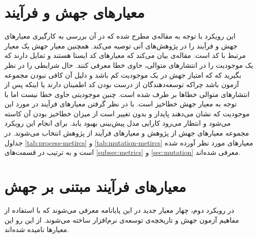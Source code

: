\section{معیارهای جهش و فرآیند}
\label{sec:method-phase1}

این رویکرد با توجه به مقاله‌ی \cite{bowes2016mutation} مطرح شده که در آن بررسی به کارگیری معیارهای جهش و فرآیند را در پژوهش‌های آتی توصیه می‌کند.  همچنین  معیار جهش یک معیار  مرتبط با کد است. مقاله‌ی \cite{rahman2013and}  بیان می‌کند که معیارهای کد ایستا هستند و تمایل دارند که یک موجودیت را در انتشارهای متوالی، حاوی خطا معرفی کنند. حال شرایطی را در نظر بگیرید که که امتیاز جهش در یک موجودیت کم باشد و دلیل آن کافی نبودن مجموعه آزمون باشد چراکه توسعه‌دهندگان از درست بودن کد اطمینان دارند یا اینکه پس از انتشارهای متوالی خطاها بر طرف شده است. چنین موجودیتی حاوی خطا نیست اما با توجه به معیار جهش خطا‌خیز است. با در نظر گرفتن معیارهای فرآیند در مورد این موجودیت که نشان می‌دهند پایدار و بدون تغییر است از میزان خطا‌خیز بودن آن کاسته می‌شود و انتظار می‌رود کارایی مدل پیش‌بینی بهبود یابد. 
برای  انجام این رویکرد مجموعه معیارهای جهش  از پژوهش \cite{bowes2016mutation}  و معیارهای فرآیند از پژوهش \cite{rahman2013and} انتخاب می‌شوند. در جداول  \ref{tab:process-metircs} و \ref{tab:mutation-metircs} معیارهای مورد نظر آورده شده است و به ترتیب در قسمت‌های \ref{subsec:metrics} و \ref{sec:mutation} معرفی شده‌اند.\\




\section{معیارهای فرآیند مبتنی بر جهش}
\label{sec:method-phase-two}
در رویکرد دوم، چهار معیار جدید در این پایانامه معرفی می‌شوند که با استفاده از مفاهیم آزمون جهش و تاریخچه‌ی توسعه‌ی نرم‌افزار ساخته می‌شوند. از این رو این معیارها   نامیده شده‌اند.

